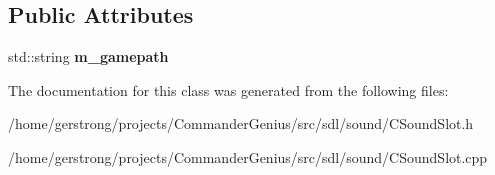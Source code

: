 \subsection*{Public Attributes}
\begin{DoxyCompactItemize}
\item 
\hypertarget{class_c_sound_slot_af84f7ff43b1980beff76ba806b75c84e}{
std::string {\bfseries m\_\-gamepath}}
\label{class_c_sound_slot_af84f7ff43b1980beff76ba806b75c84e}

\end{DoxyCompactItemize}


The documentation for this class was generated from the following files:\begin{DoxyCompactItemize}
\item 
/home/gerstrong/projects/CommanderGenius/src/sdl/sound/CSoundSlot.h\item 
/home/gerstrong/projects/CommanderGenius/src/sdl/sound/CSoundSlot.cpp\end{DoxyCompactItemize}
